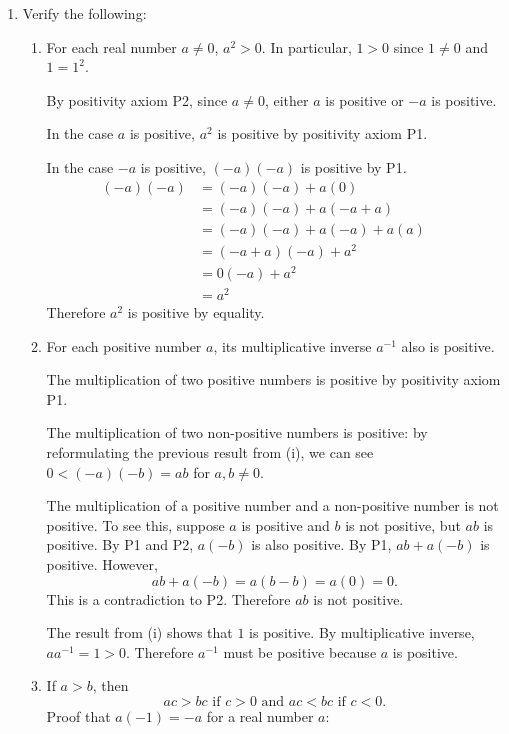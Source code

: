 \documentclass[a4paper,10pt]{book}
\theoremstyle{plain} %
\begin{document}
\begin{enumerate}
	\item Verify the following:
	\begin{enumerate}[label=(\roman*),align=left]
        \item For each real number $a\neq 0$, $a^2>0$. In particular, $1>0$ since $1 \neq 0$ and $1=1^2$.\par
        By positivity axiom P2, since $a\neq 0$, either $a$ is positive or $-a$ is positive.\par
		In the case $a$ is positive, $a^2$ is positive by positivity axiom P1.\par
		In the case $-a$ is positive, $(-a)(-a)$ is positive by P1.
		\begin{align*}
			(-a)(-a) & = (-a)(-a) + a(0) && \tag*{by additive identity}\\
			& = (-a)(-a) + a(-a+a) && \tag*{by additive inverse}\\
			& = (-a)(-a) + a(-a) + a(a) && \tag*{by distributive property} \\
			& = (-a + a)(-a) + a^2 && \tag*{by distributive property} \\
			& = 0(-a) + a^2 &&\tag*{by additive inverse} \\
			& = a^2 &&\tag*{by additive identity}
		\end{align*}
		Therefore $a^2$ is positive by equality.
        \item For each positive number $a$, its multiplicative inverse  $a^{-1}$ also is positive.\par
        The multiplication of two positive numbers is positive by positivity axiom P1.\par
		The multiplication of two non-positive numbers is positive: by reformulating the previous result from (i), we can see $0 < (-a)(-b) = ab$ for $a,b \neq 0$. \par
		The multiplication of a positive number and a non-positive number is not positive. 
		To see this, suppose $a$ is positive and $b$ is not positive, but $ab$ is positive. By P1 and P2, $a(-b)$ is also positive.
		By P1, $ab + a(-b)$ is positive. However,
		\[
		ab + a(-b) = a(b-b) = a(0) = 0.
		\]
		This is a contradiction to P2. Therefore $ab$ is not positive.
		\par
		The result from (i) shows that $1$ is positive. By multiplicative inverse, $aa^{-1} = 1 > 0$. Therefore $a^{-1}$ must be positive because $a$ is positive.
        \item If $a>b$, then \[ ac >bc \text{ if } c>0 \text{ and } ac < bc \text{ if } c<0. \]
        Proof that $a(-1)=-a$ for a real number $a$:

\end{enumerate}
\end{enumerate}
\end{document}
